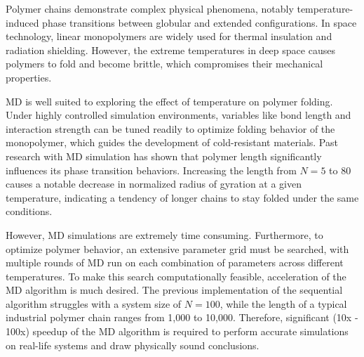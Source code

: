 \documentclass[12pt]{article}
\begin{document}
Polymer chains demonstrate complex physical phenomena, notably temperature-induced phase transitions between globular and extended configurations. In space technology, linear monopolymers are widely used for thermal insulation and radiation shielding. However, the extreme temperatures in deep space causes polymers to fold and become brittle, which compromises their mechanical properties.

MD is well suited to exploring the effect of temperature on polymer folding. Under highly controlled simulation environments, variables like bond length and interaction strength can be tuned readily to optimize folding behavior of the monopolymer, which guides the development of cold-resistant materials. Past research with MD simulation has shown that polymer length significantly influences its phase transition behaviors. Increasing the length from $N=5$ to $80$ causes a notable decrease in normalized radius of gyration at a given temperature, indicating a tendency of longer chains to stay folded under the same conditions.

However, MD simulations are extremely time consuming. Furthermore, to optimize polymer behavior, an extensive parameter grid must be searched, with multiple rounds of MD run on each combination of parameters across different temperatures. To make this search computationally feasible, acceleration of the MD algorithm is much desired. The previous implementation of the sequential algorithm struggles with a system size of $N=100$, while the length of a typical industrial polymer chain ranges from 1,000 to 10,000. Therefore, significant (10x - 100x) speedup of the MD algorithm is required to perform accurate simulations on real-life systems and draw physically sound conclusions.
\end{document}
